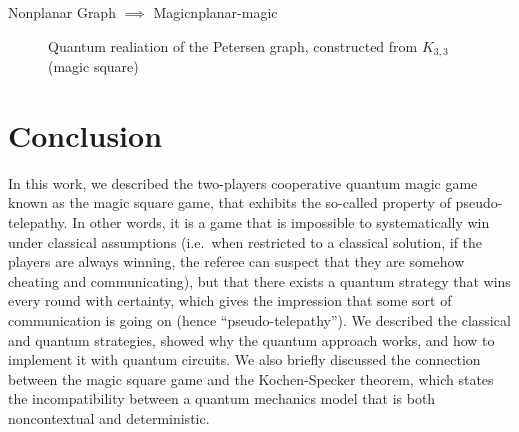 \documentclass{llncs}
\begin{document}
\begin{tcbexample}{Nonplanar Graph \(\implies\) Magic}{nplanar-magic}
\begin{figure}[H]
\begin{center}
    \end{center}
    \caption{Quantum realiation of the Petersen graph, constructed from \(K_{3, 3}\) (magic square)}
    \label{fig:petersen-final}
  \end{figure}
\end{tcbexample}

\section{Conclusion}\label{sec:conc}
In this work, we described the two-players cooperative quantum magic
game known as the magic square game, that exhibits the so-called
property of pseudo-telepathy. In other words, it is a game that is
impossible to systematically win under classical assumptions (i.e.\
when restricted to a classical solution, if the players are always
winning, the referee can suspect that they are somehow cheating and
communicating), but that there exists a quantum strategy that wins
every round with certainty, which gives the impression that some sort
of communication is going on (hence ``pseudo-telepathy'').
We described the classical and quantum strategies, showed why
the quantum approach works, and how to implement it with
quantum circuits. We also briefly discussed the connection between the
magic square game and the Kochen-Specker theorem, which states the
incompatibility between a quantum mechanics model that is both
noncontextual and deterministic.
\end{document}
